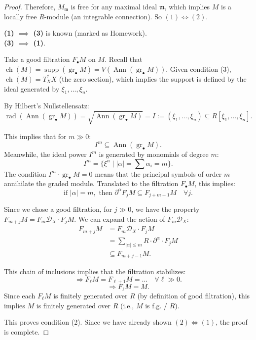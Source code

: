 \begin{proof}
    Therefore, $M_{\mathfrak{m}}$ is free for any maximal ideal $\mathfrak{m}$, which implies $M$ is a locally free $R$-module (an integrable connection).
    So $(1) \iff (2)$.

    \textbf{(1) $\implies$ (3)} is known (marked as Homework). \\

    \textbf{(3) $\implies$ (1)}.

    Take a good filtration $F_{\bullet}M$ on $M$.
    Recall that $\operatorname{ch}(M) = \operatorname{supp}(\operatorname{gr}_\bullet M) = V(\operatorname{Ann}(\operatorname{gr}_\bullet M))$.
    Given condition (3), $\operatorname{ch}(M) = T^*_X X$ (the zero section), which implies the support is defined by the ideal generated by $\xi_1, \dots, \xi_n$.

    By Hilbert's Nullstellensatz:
    \[
        \operatorname{rad}(\operatorname{Ann}(\operatorname{gr}_\bullet M)) = \sqrt{\operatorname{Ann}(\operatorname{gr}_\bullet M)} = I := (\xi_1, \dots, \xi_n) \subseteq R[\xi_1, \dots, \xi_n].
    \]

    This implies that for $m \gg 0$:
    \[
        I^m \subseteq \operatorname{Ann}(\operatorname{gr}_\bullet M).
    \]
    Meanwhile, the ideal power $I^m$ is generated by monomials of degree $m$:
    \[
        I^m = \{ \xi^\alpha \mid |\alpha| = \sum \alpha_i = m \}.
    \]
    The condition $I^m \cdot \operatorname{gr}_\bullet M = 0$ means that the principal symbols of order $m$ annihilate the graded module.
    Translated to the filtration $F_{\bullet}M$, this implies:
    \[
        \text{if } |\alpha| = m, \text{ then } \partial^\alpha F_j M \subseteq F_{j+m-1} M \quad \forall j.
    \]

    Since we chose a good filtration, for $j \gg 0$, we have the property $F_{m+j} M = F_m \mathcal{D}_X \cdot F_j M$.
    We can expand the action of $F_m \mathcal{D}_X$:
    \begin{align*}
        F_{m+j} M & = F_m \mathcal{D}_X \cdot F_j M                             \\
                  & = \sum_{|\alpha| \le m} R \cdot \partial^\alpha \cdot F_j M \\
                  & \subseteq F_{m+j-1} M.
    \end{align*}

    This chain of inclusions implies that the filtration stabilizes:
    \[
        \Rightarrow F_\ell M = F_{\ell+1} M = \dots \quad \forall \ell \gg 0.
    \]
    \[
        \Rightarrow F_\ell M = M.
    \]
    Since each $F_\ell M$ is finitely generated over $R$ (by definition of good filtration), this implies $M$ is finitely generated over $R$ (i.e., $M$ is f.g. / $R$).

    This proves condition (2). Since we have already shown $(2) \iff (1)$, the proof is complete.
\end{proof}


